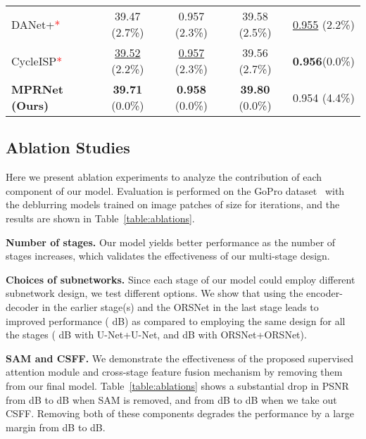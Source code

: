\documentclass[10pt,twocolumn,letterpaper]{article}
\begin{document}
\begin{table}[t]
\begin{center}
{\begin{tabular}{l c c || c c }
DANet+\textcolor{red}{*}~\cite{yue2020danet}         & 39.47 \colorbox{gray!20}{(2.7\%)} & 0.957 \colorbox{gray!20}{(2.3\%)} & 39.58 \colorbox{gray!20}{(2.5\%)} & \underline{0.955} \colorbox{gray!20}{(2.2\%)} \\
CycleISP\textcolor{red}{*}~\cite{zamir2020cycleisp}  & \underline{39.52} \colorbox{gray!20}{(2.2\%)} & \underline{0.957} \colorbox{gray!20}{(2.3\%)} & 39.56 \colorbox{gray!20}{(2.7\%)} & \textbf{0.956}\colorbox{gray!20}{(0.0\%)}  \\
\midrule[0.1em]
 \textbf{MPRNet (Ours)} & \textbf{39.71} \colorbox{gray!20}{(0.0\%)} & \textbf{0.958} \colorbox{gray!20}{(0.0\%)} & \textbf{39.80} \colorbox{gray!20}{(0.0\%)} 	& 0.954 \colorbox{gray!20}{(4.4\%)} \\
\bottomrule[0.1em]
\end{tabular}}
\end{center}\vspace{-1.7em}
\end{table}







\subsection{Ablation Studies}

Here we present ablation experiments to analyze the contribution of each component of our model. 
Evaluation is performed on the GoPro dataset~\cite{gopro2017} with the deblurring models trained on image patches of size  for  iterations, and the results are shown in   
Table~\ref{table:ablations}.


\noindent\textbf{Number of stages.} Our model yields better performance as the number of stages increases, which validates the effectiveness of our multi-stage design. 


\noindent\textbf{Choices of subnetworks.} Since each stage of our model could employ different subnetwork design, we test different options. 
We show that using the encoder-decoder in the earlier stage(s) and the ORSNet in the last stage leads to improved performance ( dB) as compared to employing the same design for all the stages ( dB with U-Net+U-Net, and  dB with ORSNet+ORSNet). 

\noindent\textbf{SAM and CSFF.} We demonstrate the effectiveness of the proposed supervised attention module and cross-stage feature fusion mechanism by removing them from our final model.  
Table~\ref{table:ablations} shows a substantial drop in PSNR from  dB to  dB when SAM is removed, and from  dB to  dB when we take out CSFF. 
Removing both of these components degrades the performance by a large margin from  dB to  dB. 
\end{document}
